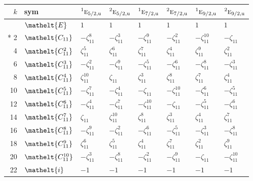 \documentclass[10pt,a4paper]{article}
\numberwithin{equation}{section}
\newcommand{\eltfont}[1]{{\let\sigma\eltsigma\mathelt{#1}}}
\newcommand{\irr}[1]{\text{\normalfont\scshape #1}}
\newcommand{\conjpair}[1]{{}^{#1}}
\newcommand{\cls}[1]{\eltfont{#1}}
\newcommand{\ptag}[1]{\mathrm{#1}}
\newcommand{\rootunity}[1]{\zeta_{#1}}
\begin{document}
{\small\setlength{\tabcolsep}{4pt}
\begin{longtable}{@{}rlllllll@{}}\toprule
$k$ & sym & $\conjpair{1}\irr{e}_{5/2,\ptag{u}}$ & $\conjpair{2}\irr{e}_{5/2,\ptag{u}}$ & $\conjpair{1}\irr{e}_{7/2,\ptag{u}}$ & $\conjpair{2}\irr{e}_{7/2,\ptag{u}}$ & $\conjpair{1}\irr{e}_{9/2,\ptag{u}}$ & $\conjpair{2}\irr{e}_{9/2,\ptag{u}}$\\\midrule\endhead
\bottomrule\endfoot\endlastfoot
0 & $\cls{E}$ & $1$ & $1$ & $1$ & $1$ & $1$ & $1$\\*
2 & $\cls{C_{11}}$ & $-\rootunity{11}^{8}$ & $-\rootunity{11}^{3}$ & $-\rootunity{11}^{9}$ & $-\rootunity{11}^{2}$ & $-\rootunity{11}^{10}$ & $-\rootunity{11}$\\
4 & $\cls{C_{11}^{2}}$ & $\rootunity{11}^{5}$ & $\rootunity{11}^{6}$ & $\rootunity{11}^{7}$ & $\rootunity{11}^{4}$ & $\rootunity{11}^{9}$ & $\rootunity{11}^{2}$\\
6 & $\cls{C_{11}^{3}}$ & $-\rootunity{11}^{2}$ & $-\rootunity{11}^{9}$ & $-\rootunity{11}^{5}$ & $-\rootunity{11}^{6}$ & $-\rootunity{11}^{8}$ & $-\rootunity{11}^{3}$\\
8 & $\cls{C_{11}^{4}}$ & $\rootunity{11}^{10}$ & $\rootunity{11}$ & $\rootunity{11}^{3}$ & $\rootunity{11}^{8}$ & $\rootunity{11}^{7}$ & $\rootunity{11}^{4}$\\
10 & $\cls{C_{11}^{5}}$ & $-\rootunity{11}^{7}$ & $-\rootunity{11}^{4}$ & $-\rootunity{11}$ & $-\rootunity{11}^{10}$ & $-\rootunity{11}^{6}$ & $-\rootunity{11}^{5}$\\
12 & $\cls{C_{11}^{6}}$ & $-\rootunity{11}^{4}$ & $-\rootunity{11}^{7}$ & $-\rootunity{11}^{10}$ & $-\rootunity{11}$ & $-\rootunity{11}^{5}$ & $-\rootunity{11}^{6}$\\
14 & $\cls{C_{11}^{7}}$ & $\rootunity{11}$ & $\rootunity{11}^{10}$ & $\rootunity{11}^{8}$ & $\rootunity{11}^{3}$ & $\rootunity{11}^{4}$ & $\rootunity{11}^{7}$\\
16 & $\cls{C_{11}^{8}}$ & $-\rootunity{11}^{9}$ & $-\rootunity{11}^{2}$ & $-\rootunity{11}^{6}$ & $-\rootunity{11}^{5}$ & $-\rootunity{11}^{3}$ & $-\rootunity{11}^{8}$\\
18 & $\cls{C_{11}^{9}}$ & $\rootunity{11}^{6}$ & $\rootunity{11}^{5}$ & $\rootunity{11}^{4}$ & $\rootunity{11}^{7}$ & $\rootunity{11}^{2}$ & $\rootunity{11}^{9}$\\
20 & $\cls{C_{11}^{10}}$ & $-\rootunity{11}^{3}$ & $-\rootunity{11}^{8}$ & $-\rootunity{11}^{2}$ & $-\rootunity{11}^{9}$ & $-\rootunity{11}$ & $-\rootunity{11}^{10}$\\
22 & $\cls{i}$ & $-1$ & $-1$ & $-1$ & $-1$ & $-1$ & $-1$\\

\end{longtable}}
\end{document}
